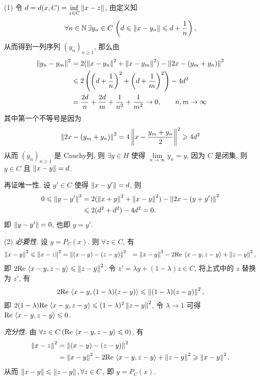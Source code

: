 \begin{Proof}
	(1) 令 $ d=d(x, C)=\inf\limits_{z\in C}\left\| x-z \right\| $, 由定义知
	\[
		\forall n\in\mathbb{N}\,\exists y_{n}\in C\,\left(d\leqslant\left\| x-y_{n} \right\|\leqslant d+\frac{1}{n}\right),
	\]
	从而得到一列序列 $ (y_{n})_{n\geqslant1} $, 那么由
	\[
		\begin{aligned}
			\left\| y_{n}-y_{m} \right\|^{2} & =2(\left\| x-y_{n} \right\|^{2}+\left\| x-y_{m} \right\|^{2})-\left\| 2x-(y_{m}+y_{n}) \right\|^{2}                              \\
			                       & \leqslant 2\left( \left( d+\frac{1}{n} \right)^{2}+\left( d+\frac{1}{m} \right)^{2} \right)-4d^{2} \\
			                       & =\frac{2d}{n}+\frac{2d}{m}+\frac{1}{n^{2}}+\frac{1}{m^{2}}\to 0,\qquad n,m\to \infty
		\end{aligned}
	\]
	其中第一个不等号是因为
	\[
		\left\| 2x-(y_{m}+y_{n}) \right\|^{2}=4\left\| x-\frac{y_{m}+y_{n}}{2} \right\|^{2}\geqslant4d^{2}
	\]
	从而 $ (y_{n})_{n\geqslant1} $ 是 Cauchy列, 则 $ \exists y\in H $ 使得 $ \lim\limits_{n\to\infty}y_{n}=y $, 因为 $ C $ 是闭集, 则 $ y\in C $ 且 $ \left\| x-y \right\|=d $.

	再证唯一性. 设 $ y'\in C $ 使得 $ \left\| x-y' \right\|=d $, 则
	\[
		\begin{aligned}
			0\leqslant\left\| y-y' \right\|^{2} & =2(\left\| x+y \right\|^{2}+\left\| x-y \right\|^{2})-\left\| 2x-(y+y') \right\|^{2} \\
			                          & \leqslant 2(d^{2}+d^{2})-4d^{2}=0.
		\end{aligned}
	\]
	即 $ \left\| y-y' \right\|=0 $, 也即 $ y=y' $.

	(2) \textsl{必要性}. 设 $ y=P_{C}(x) $. 则 $ \forall z\in C $, 有
	\[
		\begin{aligned}
			\left\| x-y \right\|^{2}\leqslant\left\| x-z \right\|^{2} & = \left\| (x-y)-(z-y) \right\|^{2}
			                                      & =\left\| x-y \right\|^{2}-2\mathrm{Re\,}\left\langle x-y, z-y \right\rangle+\left\| z-y \right\|^{2},
		\end{aligned}
	\]
	即 $ 2\mathrm{Re\,}\left\langle x-y, z-y \right\rangle\leqslant\left\| z-y \right\|^{2} $. 令 $ z'=\lambda y+(1-\lambda)z\in C $, 将上式中的 $ z $ 替换为 $ z' $, 有
	\[
		2\mathrm{Re\,}\left\langle x-y, (1-\lambda)(z-y) \right\rangle\leqslant\left\| (1-\lambda)(z-y) \right\|^{2},
	\]
	即 $ 2(1-\lambda)\mathrm{Re\,}\left\langle x-y, z-y \right\rangle\leqslant(1-\lambda)^2\left\| z-y \right\|^{2} $, 令 $ \lambda\to 1 $ 可得 $ \mathrm{Re\,}\left\langle x-y, z-y \right\rangle\leqslant0 $.

	\textsl{充分性}. 由 $ \forall z\in C\,(\mathrm{Re\,}\left\langle x-y, z-y \right\rangle\leqslant0) $, 有
	\[
		\begin{aligned}
			\left\| x-z \right\|^{2} & = \left\| (x-y)-(z-y) \right\|^{2}                                                      \\
			               & =\left\| x-y \right\|^{2}-2\mathrm{Re\,}\left\langle x-y, z-y \right\rangle+\left\| z-y \right\|^{2}\geqslant\left\| x-y \right\|^{2}.
		\end{aligned}
	\]
	从而 $ \left\| x-y \right\|\leqslant\left\| z-y \right\|, \forall z\in C $, 即 $ y=P_{C}(x) $.


\end{Proof}
